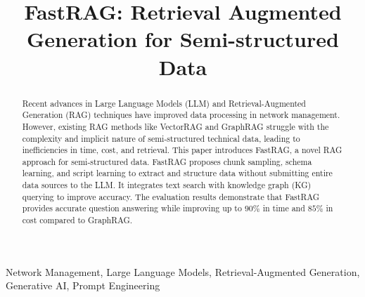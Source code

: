 \documentclass[conference]{IEEEtran}
\begin{document}
\title{FastRAG: Retrieval Augmented Generation for Semi-structured Data}

\author{
\and
{}
\and
{}
\and
{}
}

\maketitle

\begin{abstract}
Recent advances in Large Language Models (LLM) and Retrieval-Augmented Generation (RAG) techniques have improved data processing in network management. However, existing RAG methods like VectorRAG and GraphRAG struggle with the complexity and implicit nature of semi-structured technical data, leading to inefficiencies in time, cost, and retrieval.
This paper introduces FastRAG, a novel RAG approach for semi-structured data. FastRAG proposes chunk sampling, schema learning, and script learning to extract and structure data without submitting entire data sources to the LLM. It integrates text search with knowledge graph (KG) querying to improve accuracy. The evaluation results demonstrate that FastRAG provides accurate question answering while improving up to $90\%$ in time and $85\%$ in cost compared to GraphRAG.
\end{abstract}

\begin{IEEEkeywords}
Network Management, Large Language Models, Retrieval-Augmented Generation, Generative AI, Prompt Engineering
\end{IEEEkeywords}

\end{document}
